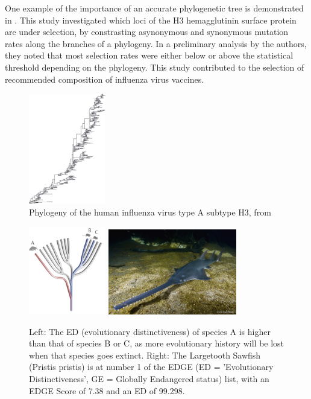 One example of the importance of an accurate phylogenetic tree 
is demonstrated in \cite{bush1999positive}. This study
investigated which loci of the H3 hemagglutinin surface protein
are under selection, by constrasting asynonymous and synonymous
mutation rates along the branches of a phylogeny. 
In a preliminary analysis by the authors, they noted that
most selection rates were either below or above the 
statistical threshold depending on the phylogeny.
This study contributed to the selection of recommended 
composition of influenza virus vaccines.

\begin{figure}[H]
  \includegraphics[width=0.3\textwidth]{bush_et_al_1999}
  \caption{
    Phylogeny of the human influenza virus type A subtype H3,
    from \cite{bush1999positive}
  }
  \label{fig:bush_et_al_1999}
\end{figure}

\begin{figure}[H]
  \includegraphics[width=0.3\textwidth]{edge_tree.png}
  \includegraphics[width=0.5\textwidth]{Pristis-pristis_Simon-Fraser-University-1000x667.jpg}
  \caption{
    Left: The ED (evolutionary distinctiveness)       
    of species A is higher than that of species 
    B or C, as more                             
    evolutionary history will be lost when      
    that species goes extinct.
    Right: The Largetooth Sawfish (Pristis pristis) is at number 1 of the 
    EDGE (ED = 'Evolutionary Distinctiveness', GE = Globally Endangered status) 
    list, with an EDGE Score of 7.38 and an ED of 99.298.
 }
  \label{fig:edge_species}
\end{figure}

